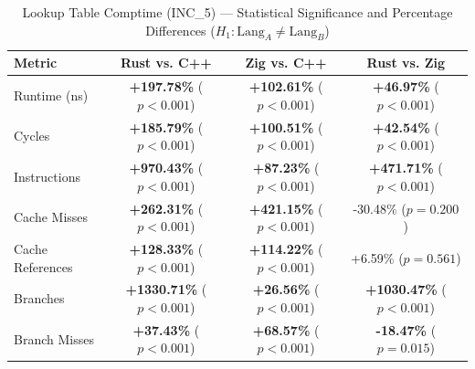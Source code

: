 \begin{table}[htbp]
\centering
\caption{Lookup Table Comptime (INC_5) --- Statistical Significance and Percentage Differences ($H_1: \text{Lang}_A \neq \text{Lang}_B$)}
\label{tab:lut_comptime_5}
\begin{tabular}{l ccc}
\toprule
\textbf{Metric} & \textbf{Rust vs. C++} & \textbf{Zig vs. C++} & \textbf{Rust vs. Zig} \\
\midrule
Runtime (ns) & \textbf{+197.78\%} ($p < 0.001$) & \textbf{+102.61\%} ($p < 0.001$) & \textbf{+46.97\%} ($p < 0.001$) \\
Cycles & \textbf{+185.79\%} ($p < 0.001$) & \textbf{+100.51\%} ($p < 0.001$) & \textbf{+42.54\%} ($p < 0.001$) \\
Instructions & \textbf{+970.43\%} ($p < 0.001$) & \textbf{+87.23\%} ($p < 0.001$) & \textbf{+471.71\%} ($p < 0.001$) \\
Cache Misses & \textbf{+262.31\%} ($p < 0.001$) & \textbf{+421.15\%} ($p < 0.001$) & -30.48\% ($p = 0.200$) \\
Cache References & \textbf{+128.33\%} ($p < 0.001$) & \textbf{+114.22\%} ($p < 0.001$) & +6.59\% ($p = 0.561$) \\
Branches & \textbf{+1330.71\%} ($p < 0.001$) & \textbf{+26.56\%} ($p < 0.001$) & \textbf{+1030.47\%} ($p < 0.001$) \\
Branch Misses & \textbf{+37.43\%} ($p < 0.001$) & \textbf{+68.57\%} ($p < 0.001$) & \textbf{-18.47\%} ($p = 0.015$) \\
\bottomrule
\end{tabular}
\end{table}


